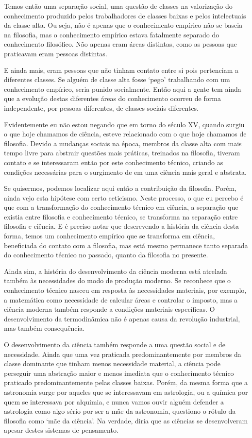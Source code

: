 Temos então uma separação social, uma questão de classes na valorização do conhecimento produzido pelos trabalhadores de classes baixas e pelos intelectuais da classe alta. Ou seja, não é apenas que o conhecimento empírico não se baseia na filosofia, mas o conhecimento empírico estava fatalmente separado do conhecimento filosófico. Não apenas eram áreas distintas, como as pessoas que praticavam eram pessoas distintas. 

E ainda mais, eram pessoas que não tinham contato entre si pois pertenciam a diferentes classes. Se alguém de classe alta fosse ‘pego’ trabalhando com um conhecimento empírico, seria punido socialmente. Então aqui a gente tem ainda que a evolução destas diferentes áreas do conhecimento ocorreu de forma independente, por pessoas diferentes, de classes sociais diferentes. 

Evidentemente eu não estou negando que em torno do século XV, quando surgiu o que hoje chamamos de ciência, esteve relacionado com o que hoje chamamos de filosofia. Devido a mudanças sociais na época, membros da classe alta com mais tempo livre para abstrair questões mais práticas, treinados na filosofia, tiveram contato e se interessaram então por este conhecimento técnico, criando as condições necessárias para o surgimento de em uma ciência mais geral e abstrata. 

Se quisermos, podemos localizar aqui então a contribuição da filosofia. Porém, ainda vejo esta hipótese com certo ceticismo. Neste processo, o que eu percebo é que com a transformação do conhecimento técnico em ciência, a separação que existia entre filosofia e conhecimento técnico, se transforma na separação entre filosofia e ciência. E é preciso notar que descrevendo a história da ciência desta forma, temos um conhecimento empírico que se transforma em ciência, beneficiada do contato com a filosofia, mas está mesmo permanece tanto separada do conhecimento técnico no passado, quanto da filosofia no presente.

Ainda sim, a história do desenvolvimento da ciência moderna está atrelada também às necessidades do modo de produção moderno. Se reconhece que o conhecimento técnico nasceu em resposta às necessidades materiais, por exemplo, a matemática como necessidade de calcular áreas e controlar o imposto, mas a ciência moderna também responde a condições materiais específicas. O desenvolvimento da termodinâmica não é apenas causa da revolução industrial, mas também consequência.

O desenvolvimento da ciência também responde a uma questão social e de necessidade. Ainda que uma vez praticada predominantemente por membros da classe dominante que tinham menos necessidade material, a ciência pode perseguir uma abstração maior e menos imediata que o conhecimento técnico praticado predominantemente pelas classes baixas. Porém, da mesma forma que a astronomia surge por aqueles que se interessavam em astrologia, ou a química por quem se interessava por alquimia, e nunca vamos ouvir alguém defender a astrologia como algo sério por ser a mãe da astronomia, questiono o rótulo da filosofia como ‘mãe da ciência’. Na verdade, diria que as ciências se desenvolveram apesar destes sistemas de pensamento.

